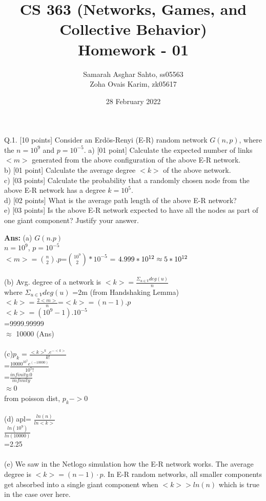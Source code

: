 \documentclass[answers]{exam}
\title{CS 363 (Networks, Games, and Collective Behavior)\\ Homework - 01}
\author{Samarah Asghar Sahto, ss05563 \\ Zoha Ovais Karim, zk05617}
\date{28 February 2022}
\begin{document}
\maketitle

\noindent \hrulefill
\begin{questions}
    
    \question Q.1. [10 points] Consider an Erdös-Renyi (E-R) random network $G(n, p)$, where the $n=10^{9}$ and $p=10^{-5}$.
a) [01 point] Calculate the expected number of links $<m>$ generated from the above configuration of the above E-R network.\\
b) [01 point] Calculate the average degree $<k>$ of the above network.\\
c) [03 points] Calculate the probability that a randomly chosen node from the above E-R network has a degree $k=10^{5}$.\\
d) [02 points] What is the average path length of the above E-R network?\\
e) [03 points] Is the above E-R network expected to have all the nodes as part of one giant component? Justify your answer.
\begin{framed}
\textbf{Ans:} (a) $G(n.p)$
\\ $n=10^9$, $p=10^{-5}$\\ $<m>={n \choose 2}.p$=${10^9 \choose 2}*10^{-5}$ = $4.999 * 10^{12} \\ \approx 5 * 10^{12}$\\\\
(b) Avg. degree of a network is $<k>=\frac{\Sigma_{u \in V}deg(u)}{n}$\\where $\Sigma_{u \in V}deg(u)$ =2m (from Handshaking Lemma)\\$<k>=\frac{2<m>}{n}$=$<k>=(n-1).p$\\$<k>=(10^9 -1). 10 ^{-5}$\\=9999.99999\\ $\approx$ 10000 (Ans)\\\\
(c)$p_k=\frac{<k>^k.e^{-<k>}}{k!}$\\=$\frac{10000^{10^5}e^{(-10000)}}{10^5!}$\\=$\frac{infinity.0}{infinity}$\\$\approx$0\\from poisson dist, $p_k -> 0$\\\\
(d) apl= $\frac{ln(n)}{ln<k>}$\\$\frac{ln(10^9)}{ln(10000)}$\\=2.25\\\\(e) We saw in the Netlogo simulation how the E-R network works. The average degree is $<k>=(n-1) \cdot p$. In E-R random networks, all smaller components get absorbed into a single giant component when $<k> > ln(n)$ which is true in the case over here. 


\end{framed}
\end{questions}
\end{document}
